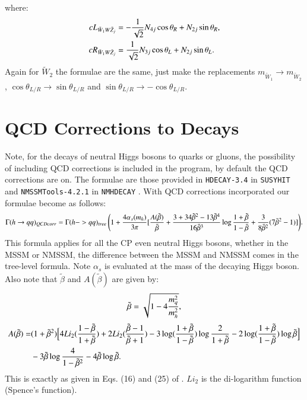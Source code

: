 \documentclass[final,3p,times]{elsarticle}
\begin{document}
where:
\begin{align}
{cL}_{\tilde{W}_1 W \tilde{Z}_j} &= -{1 \over \sqrt{2}} N_{4j}\cos\theta_R + N_{2j}\sin\theta_R, \\
{cR}_{\tilde{W}_1 W \tilde{Z}_j} &= {1 \over \sqrt{2}} N_{3j}\cos\theta_L + N_{2j}\sin\theta_L.
\end{align}
Again for $\tilde{W}_2$ the formulae are the same, just make the replacements $m_{\tilde{W}_1} \rightarrow m_{\tilde{W}_2}$, $\cos\theta_{L/R} \rightarrow \sin\theta_{L/R}$ and $\sin\theta_{L/R} \rightarrow -\cos\theta_{L/R}$.

\section{QCD Corrections to Decays} \label{appendix:QCDcorrdec}
Note, for the decays of neutral Higgs bosons to quarks or gluons, the possibility of including QCD corrections is included in the program, by default the QCD corrections are on. The formulae are those provided in {\tt HDECAY-3.4} in {\tt SUSYHIT} \cite{Djouadi:2006bz,Djouadi:1997yw} and {\tt NMSSMTools-4.2.1} in {\tt NMHDECAY} \cite{Ellwanger:2004xm,Ellwanger:2006ch}. With QCD corrections incorporated our formulae become as follows:
\begin{equation} \label{hqqQCDcorr}
\begin{aligned}
\Gamma(h \rightarrow qq)_{QCDcorr}= \Gamma(h-> qq)_{tree} \left(1 + {4 \alpha_s(m_h) \over 3 \pi} [{A(\tilde{\beta}) \over \tilde{\beta}} + {3 + 34 \tilde{\beta}^2 - 13 \tilde{\beta}^4 \over 16 \tilde{\beta}^3} \log{1+\tilde{\beta} \over 1 - \tilde{\beta}} + {3 \over 8 \tilde{\beta}^2} (7 \tilde{\beta}^2 - 1)]\right)
\end{aligned}.
\end{equation}
This formula applies for all the CP even neutral Higgs bosons, whether in the MSSM or NMSSM, the difference between the MSSM and NMSSM comes in the tree-level formula. Note $\alpha_s$ is evaluated at the mass of the decaying Higgs boson. Also note that $\tilde{\beta}$ and $A(\tilde{\beta})$ are given by:
\begin{equation}
\tilde{\beta} = \sqrt{1 - 4{m_{q}^2 \over m_{h}^2}},
\end{equation}
\begin{equation}
\begin{aligned}
A(\tilde{\beta}) = & (1+\tilde{\beta}^2)\Big[4Li_2 ({1-\tilde{\beta} \over 1+\tilde{\beta}}) + 2Li_2 ({\tilde{\beta}-1  \over \tilde{\beta}+1}) - 3\log({1+\tilde{\beta} \over 1-\tilde{\beta}})\log{2\over 1+\tilde{\beta}} - 2\log({1+\tilde{\beta} \over 1-\tilde{\beta}})\log\tilde{\beta}\Big] \\ & - 3\tilde{\beta} \log{4 \over 1-\tilde{\beta}^2} - 4\tilde{\beta} \log\tilde{\beta}.
\end{aligned}
\end{equation}
This is exactly as given in Eqs. (16) and (25) of \cite{Spira:2016}. $Li_2$ is
the di-logarithm function (Spence's function). 
\end{document}

